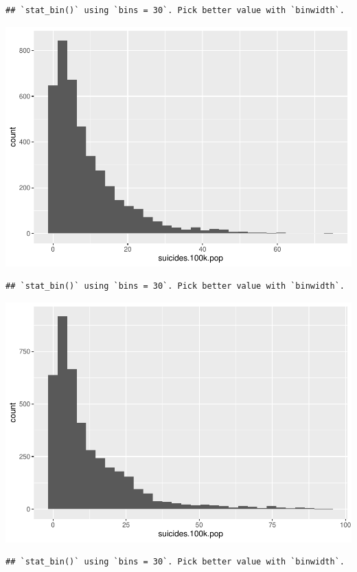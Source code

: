 \documentclass[11pt,]{article}
\begin{document}
\begin{verbatim}
## `stat_bin()` using `bins = 30`. Pick better value with `binwidth`.
\end{verbatim}

\includegraphics{An-Analysis-of-Suicide-Data_files/figure-latex/unnamed-chunk-1-6.pdf}

\begin{verbatim}
## `stat_bin()` using `bins = 30`. Pick better value with `binwidth`.
\end{verbatim}

\includegraphics{An-Analysis-of-Suicide-Data_files/figure-latex/unnamed-chunk-1-7.pdf}

\begin{verbatim}
## `stat_bin()` using `bins = 30`. Pick better value with `binwidth`.
\end{verbatim}
\end{document}
